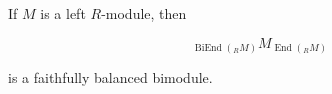 If $M$ is a left $R$-module, then

$${}_{\operatorname{BiEnd}(_R M)} M_{\operatorname{End}(_R M)}$$

is a faithfully balanced bimodule.
